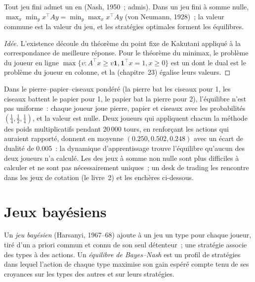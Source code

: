 \begin{theorem}\label{thm:qm:games-auctions-and-information:minimax}
Tout jeu fini admet un  en  (Nash, 1950~; admis). Dans un jeu fini à somme nulle, $\max_x\min_yx^\top Ay = \min_y\max_xx^\top Ay$ (von Neumann, 1928)~; la valeur commune est la valeur
du jeu, et les stratégies optimales forment les équilibres.
\end{theorem}

\begin{proof}[Idée]
L'existence découle du théorème du point fixe de Kakutani appliqué à la correspondance de meilleure réponse. Pour le théorème du minimax, le problème du joueur en ligne $\max\{v : A^\top x \ge v\mathbf 1, \mathbf 1^\top x = 1, x \ge
0\}$ est un  dont le dual est le problème du joueur en colonne, et la  (chapitre~23) égalise leurs valeurs.
\end{proof}

Dans le pierre--papier--ciseaux pondéré (la pierre bat les ciseaux pour 1, les ciseaux battent le papier pour 1, le papier bat la pierre pour 2), l'équilibre n'est pas uniforme~: chaque joueur joue pierre, papier et ciseaux avec les probabilités
$(\frac14, \frac12, \frac14)$, et la valeur est nulle. Deux joueurs qui appliquent chacun la méthode des poids multiplicatifs pendant 20\,000 tours, en renforçant les actions qui auraient rapporté, donnent en moyenne $(0.250, 0.502, 0.248)$ avec un
écart de dualité de 0.005~: la dynamique d'apprentissage trouve l'équilibre qu'aucun des deux joueurs n'a calculé. Les  des jeux à somme non nulle sont plus difficiles à calculer et ne sont pas nécessairement uniques~; un desk de trading les rencontre dans
les jeux de cotation (le livre~2) et les enchères ci-dessous.

\section{Jeux bayésiens}

\begin{definition}\label{def:qm:games-auctions-and-information:bayes}
Un \emph{jeu bayésien} (Harsanyi, 1967--68) ajoute à un jeu un type pour chaque joueur, tiré d'un a priori commun et connu de son seul détenteur~; une stratégie associe des types à des actions. Un
\emph{équilibre de Bayes--Nash} est un profil de stratégies dans lequel l'action de chaque type maximise son gain espéré compte tenu de ses croyances sur les types des autres et sur leurs stratégies.
\end{definition}

